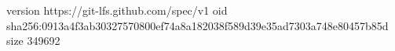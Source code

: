 version https://git-lfs.github.com/spec/v1
oid sha256:0913a4f3ab30327570800ef74a8a182038f589d39e35ad7303a748e80457b85d
size 349692

